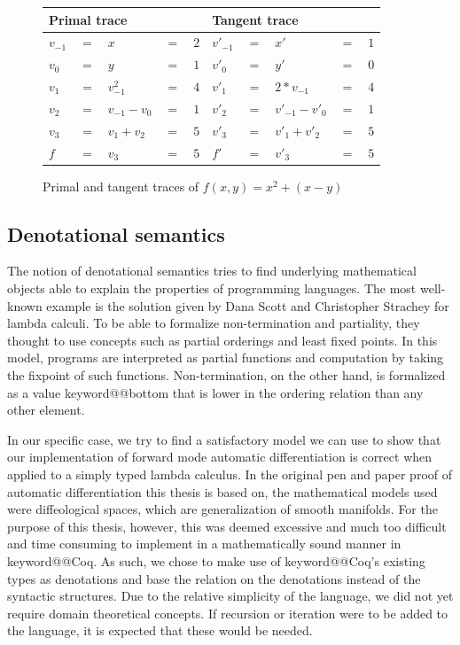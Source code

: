 \documentclass[12pt, final]{article}
\makeatletter
\def\<#1>{\csname keyword@@#1\endcsname}
\makeatother
\begin{document}
\begin{figure}[h]
  \begin{center}
    \begin{tabular}{ l l l l l | l l l l l }
      \hline
      \multicolumn{5}{l}{Primal trace} & \multicolumn{5}{l}{Tangent trace} \\
      \hline
$v_{-1} $&$=$&$x$&$=$&$2$             &$v'_{-1}$&$=$&$x'$&$=$&$1$ \\
$v_0    $&$=$&$y$&$=$&$1$             &$v'_{0}$&$=$&$y'$&$=$&$0$ \\
      \hline
$v_1    $&$=$&$v_{-1}^2$&$=$&$4$      &$v'_{1}$&$=$&$2*v_{-1}$&$=$&$4$ \\
$v_2    $&$=$&$v_{-1} - v_{0}$&$=$&$1$&$v'_{2}$&$=$&$v'_{-1}-v'_{0}$&$=$&$1$ \\
$v_3    $&$=$&$v_1 + v_2$&$=$&$5$     &$v'_{3}$&$=$&$v'_1 + v'_2$&$=$&$5$ \\
      \hline
$f      $&$=$&$v_3$&$=$&$5$           &$f'$&$=$&$v'_3$&$=$&$5$ \\
      \hline
    \end{tabular}
  \end{center}
  \caption{Primal and tangent traces of $f(x, y) = x^2 + (x - y)$}
  \label{table:func_trace}
\end{figure}


\subsection{Denotational semantics}

The notion of denotational semantics tries to find underlying mathematical objects able to explain the properties of programming languages. The most well-known example is the solution given by Dana Scott and Christopher Strachey\cite{Scott1977} for lambda calculi.
To be able to formalize non-termination and partiality, they thought to use concepts such as partial orderings and least fixed points\cite{aaby2020}.
In this model, programs are interpreted as partial functions and computation by taking the fixpoint of such functions.
Non-termination, on the other hand, is formalized as a value \<bottom> that is lower in the ordering relation than any other element.

In our specific case, we try to find a satisfactory model we can use to show that our implementation of forward mode automatic differentiation is correct when applied to a simply typed lambda calculus.
In the original pen and paper proof of automatic differentiation this thesis is based on, the mathematical models used were diffeological spaces, which are generalization of smooth manifolds.
For the purpose of this thesis, however, this was deemed excessive and much too difficult and time consuming to implement in a mathematically sound manner in \<Coq>.
As such, we chose to make use of \<Coq>'s existing types as denotations and base the relation on the denotations instead of the syntactic structures.
Due to the relative simplicity of the language, we did not yet require domain theoretical concepts. If recursion or iteration were to be added to the language, it is expected that these would be needed.
\end{document}

